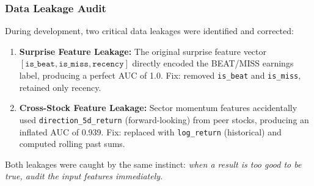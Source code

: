 \documentclass[12pt,a4paper]{article}
\begin{document}
\subsubsection{Data Leakage Audit}

During development, two critical data leakages were identified and corrected:

\begin{enumerate}
    \item \textbf{Surprise Feature Leakage:} The original surprise feature vector $[\texttt{is\_beat}, \texttt{is\_miss}, \texttt{recency}]$ directly encoded the BEAT/MISS earnings label, producing a perfect AUC of 1.0. Fix: removed \texttt{is\_beat} and \texttt{is\_miss}, retained only recency.

    \item \textbf{Cross-Stock Feature Leakage:} Sector momentum features accidentally used \texttt{direction\_5d\_return} (forward-looking) from peer stocks, producing an inflated AUC of 0.939. Fix: replaced with \texttt{log\_return} (historical) and computed rolling past sums.
\end{enumerate}

Both leakages were caught by the same instinct: \textit{when a result is too good to be true, audit the input features immediately.}


\end{document}
